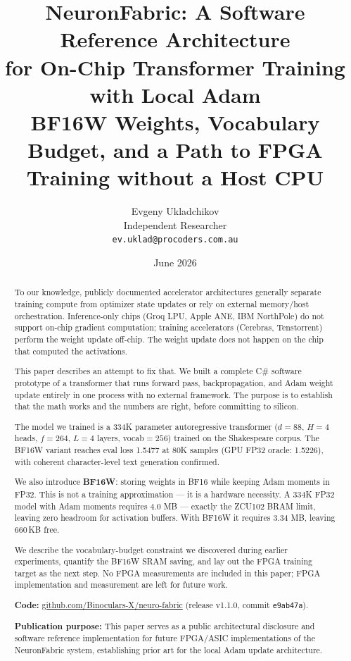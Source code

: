 \documentclass[11pt]{article}
\title{\textbf{NeuronFabric: A Software Reference Architecture\\
for On-Chip Transformer Training with Local Adam}\\[0.5em]
\large BF16W Weights, Vocabulary Budget, and a Path to FPGA Training without a Host CPU}
\author{
  Evgeny Ukladchikov \\
  Independent Researcher \\
  \texttt{ev.uklad@procoders.com.au} \\[0.3em]
  \small \href{\repourl}{\repourltext}
}
\date{June 2026}
\newcommand{\repourl}{https://github.com/Binoculars-X/neuro-fabric}
\newcommand{\gpuvaloss}{1.5226}
\newcommand{\cpubfvaloss}{1.5477}
\newcommand{\repourltext}{github.com/Binoculars-X/neuro-fabric}
\newcommand{\repoversion}{v1.1.0}
\newcommand{\repocommit}{e9ab47a}
\begin{document}
\maketitle

\begin{abstract}

To our knowledge, publicly documented accelerator architectures generally separate
training compute from optimizer state updates or rely on external memory/host
orchestration. Inference-only chips (Groq LPU, Apple ANE, IBM NorthPole) do not
support on-chip gradient computation; training accelerators (Cerebras, Tenstorrent)
perform the weight update off-chip. The weight update does not happen on the chip
that computed the activations.

This paper describes an attempt to fix that. We built a complete C\# software prototype
of a transformer that runs forward pass, backpropagation, and Adam weight update
entirely in one process with no external framework. The purpose is to establish that
the math works and the numbers are right, before committing to silicon.

The model we trained is a 334K parameter autoregressive transformer
($d{=}88$, $H{=}4$ heads, $f{=}264$, $L{=}4$ layers, vocab$=256$) trained on the
Shakespeare corpus. The BF16W variant reaches eval loss \cpubfvaloss{} at 80K samples
(GPU FP32 oracle: \gpuvaloss{}), with coherent character-level text generation confirmed.

We also introduce \textbf{BF16W}: storing weights in BF16 while keeping Adam moments
in FP32. This is not a training approximation --- it is a hardware necessity.
A 334K FP32 model with Adam moments requires 4.0 MB --- exactly the ZCU102 BRAM limit,
leaving zero headroom for activation buffers. With BF16W it requires 3.34 MB,
leaving 660\,KB free.

We describe the vocabulary-budget constraint we discovered during earlier experiments,
quantify the BF16W SRAM saving, and lay out the FPGA training target as the next step.
No FPGA measurements are included in this paper; FPGA implementation and measurement are left for future work.

\textbf{Code:} \href{\repourl}{\repourltext} (release \repoversion, commit \texttt{\repocommit}).

\textbf{Publication purpose:} This paper serves as a public architectural disclosure
and software reference implementation for future FPGA/ASIC implementations of the
NeuronFabric system, establishing prior art for the local Adam update architecture.

\end{abstract}
\end{document}
